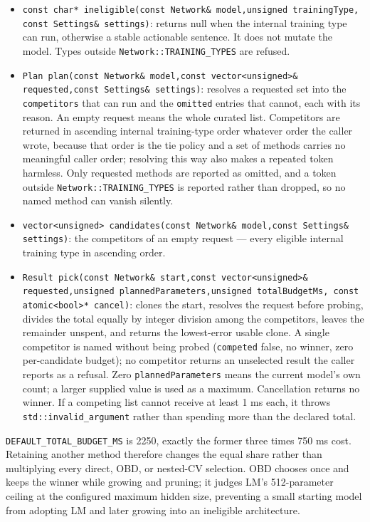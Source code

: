 \begin{itemize}
\item \texttt{const char* ineligible(const Network\& model,unsigned trainingType,
      const Settings\& settings)}: returns null when the internal training type
      can run, otherwise a stable actionable sentence. It does not mutate the
      model. Types outside \texttt{Network::TRAINING\_TYPES} are refused.
\item \texttt{Plan plan(const Network\& model,const vector<unsigned>\&
      requested,const Settings\& settings)}: resolves a requested set into the
      \texttt{competitors} that can run and the \texttt{omitted} entries that
      cannot, each with its reason. An empty request means the whole curated
      list. Competitors are returned in ascending internal training-type order
      whatever order the caller wrote, because that order is the tie policy and
      a set of methods carries no meaningful caller order; resolving this way
      also makes a repeated token harmless. Only requested methods are reported
      as omitted, and a token outside \texttt{Network::TRAINING\_TYPES} is
      reported rather than dropped, so no named method can vanish silently.
\item \texttt{vector<unsigned> candidates(const Network\& model,const Settings\&
      settings)}: the competitors of an empty request --- every eligible
      internal training type in ascending order.
\item \texttt{Result pick(const Network\& start,const vector<unsigned>\&
      requested,unsigned plannedParameters,unsigned totalBudgetMs,
      const atomic<bool>* cancel)}: clones the start, resolves the request
      before probing, divides the total equally by integer division among the
      competitors, leaves the remainder unspent, and returns the lowest-error
      usable clone. A single competitor is named without being probed
      (\texttt{competed} false, no winner, zero per-candidate budget); no
      competitor returns an unselected result the caller reports as a refusal.
      Zero \texttt{plannedParameters} means the current model's own count; a
      larger supplied value is used as a maximum. Cancellation returns no
      winner. If a competing list cannot receive at least 1 ms each, it throws
      \texttt{std::invalid\_argument} rather than spending more than the
      declared total.
\end{itemize}

\texttt{DEFAULT\_TOTAL\_BUDGET\_MS} is 2250, exactly the former three times
750 ms cost. Retaining another method therefore changes the equal share rather
than multiplying every direct, OBD, or nested-CV selection. OBD chooses once and
keeps the winner while growing and pruning; it judges LM's 512-parameter ceiling
at the configured maximum hidden size, preventing a small starting model from
adopting LM and later growing into an ineligible architecture.


